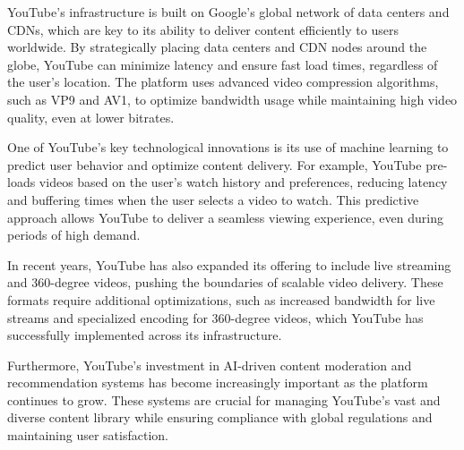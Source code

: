 YouTube's infrastructure is built on Google's global network of data centers and CDNs, which are key to its ability to deliver content efficiently to users worldwide. By strategically placing data centers and CDN nodes around the globe, YouTube can minimize latency and ensure fast load times, regardless of the user's location\cite{google_cloud}. The platform uses advanced video compression algorithms, such as VP9 and AV1, to optimize bandwidth usage while maintaining high video quality, even at lower bitrates\cite{youtube_compression}.

One of YouTube's key technological innovations is its use of machine learning to predict user behavior and optimize content delivery. For example, YouTube pre-loads videos based on the user's watch history and preferences, reducing latency and buffering times when the user selects a video to watch\cite{youtube_ml}. This predictive approach allows YouTube to deliver a seamless viewing experience, even during periods of high demand.

In recent years, YouTube has also expanded its offering to include live streaming and 360-degree videos, pushing the boundaries of scalable video delivery. These formats require additional optimizations, such as increased bandwidth for live streams and specialized encoding for 360-degree videos, which YouTube has successfully implemented across its infrastructure\cite{youtube_live}.

Furthermore, YouTube's investment in AI-driven content moderation and recommendation systems has become increasingly important as the platform continues to grow. These systems are crucial for managing YouTube's vast and diverse content library while ensuring compliance with global regulations and maintaining user satisfaction\cite{youtube_ai}.

